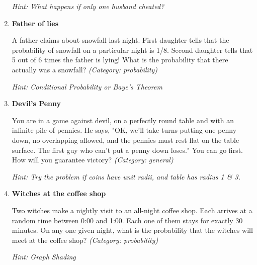 \begin{enumerate}
\small\emph{Hint: What happens if only one husband cheated?}





\item \textbf{Father of lies}

A father claims about snowfall last night. First daughter tells that the probability of snowfall on a particular night is 1/8. Second daughter tells that 5 out of 6 times the father is lying! What is the probability that there actually was a snowfall?
\small\emph{(Category: probability)}

\small\emph{Hint: Conditional Probability or Baye's Theorem}





\item \textbf{Devil's Penny}

You are in a game against devil, on a perfectly round table and with an infinite pile of pennies. He says, "OK, we'll take turns putting one penny down, no overlapping allowed, and the pennies must rest flat on the table surface. The first guy who can't put a penny down loses." You can go first. How will you guarantee victory?
\small\emph{(Category: general)}

\small\emph{Hint: Try the problem if coins have unit radii, and table has radius 1 \& 3.}





\item \textbf{Witches at the coffee shop}

Two witches make a nightly visit to an all-night coffee shop. Each arrives at a random time between 0:00 and 1:00. Each one of them stays for exactly 30 minutes. On any one given night, what is the probability that the witches will meet at the coffee shop?
\small\emph{(Category: probability)}

\small\emph{Hint: Graph Shading}


\end{enumerate}
